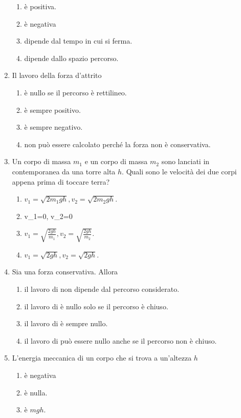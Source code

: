 \documentclass{article}
\begin{document}
\begin{enumerate}
\begin{enumerate}[label=\Alph*.]
    \item è positiva.
    \item è negativa
    \item dipende dal tempo in cui si ferma.
    \item dipende dallo spazio percorso.
  \end{enumerate}
  \item Il lavoro della forza d'attrito
  \begin{enumerate}[label=\Alph*.]
    \item è nullo se il percorso è rettilineo.
    \item è sempre positivo.
    \item è sempre negativo.
    \item non può essere calcolato perché la forza non è conservativa.
  \end{enumerate}
  \item Un corpo di massa $m_1$ e un corpo di massa $m_2$ sono lanciati in contemporanea da una torre alta $h$. Quali sono le velocità dei due corpi appena prima di toccare terra?
  \begin{enumerate}[label=\Alph*.]
    \item $v_1=\sqrt{2m_1gh}, v_2=\sqrt{2m_2gh}$.
    \item v_1=0, v_2=0
    \item $v_1=\sqrt{\frac{2gh}{m_1}}, v_2=\sqrt{\frac{2gh}{m_2}}$.
    \item $v_1=\sqrt{2gh}, v_2=\sqrt{2gh}$.
  \end{enumerate}
  \item Sia  una forza conservativa. Allora
  \begin{enumerate}[label=\Alph*.]
    \item il lavoro di  non dipende dal percorso considerato.
    \item il lavoro di  è nullo solo se il percorso è chiuso.
    \item il lavoro di  è sempre nullo.
    \item il lavoro di  può essere nullo anche se il percorso non è chiuso.
  \end{enumerate}
  \item L'energia meccanica di un corpo che si trova a un'altezza $h$
  \begin{enumerate}[label=\Alph*.]
    \item è negativa
    \item è nulla.
    \item è $mgh$.

\end{enumerate}
\end{enumerate}
\end{document}
